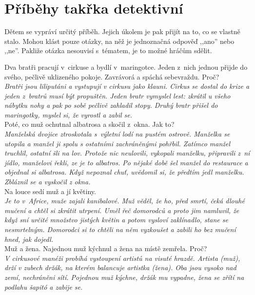 
\section{Příběhy takřka detektivní}

Dětem se vypráví určitý příběh. Jejich úkolem je pak přijít 
na to, co se vlastně stalo. Mohou klást pouze otázky, na něž 
je jednoznačná odpověď ,,ano'' nebo ,,ne''. Pakliže otázka nesouvisí 
s~tématem, je to možné hráčům sdělit.

\begin{multicols}{\value{columnsgames}}

\noindent
Dva bratři pracují v~cirkuse a bydlí v~maringotce. 
Jeden z~nich jednou přijde do svého, pečlivě uklizeného 
pokoje. Zavrávorá a spáchá sebevraždu. Proč?\\[1 mm]
{\sl Bratři jsou liliputáni a vystupují v cirkusu jako klauni. 
Cirkus se dostal do krize a jeden z~bratrů musí být propuštěn. 
Jeden bratr vymyslel lest: zkrátil u všeho nábytku nohy a pak 
po sobě pečlivě zahladil stopy. Druhý bratr přišel do maringotky, 
myslel si, že vyrostl a zabil se.}\\

\noindent
Poté, co muž ochutnal albatrosa a skočil z~okna. Jak to?\\[1 mm]
{\sl Manželská dvojice ztroskotala s~výletní lodí na pustém 
ostrově. Manželka se utopila a manžel ji spolu s ostatními zachráněnými 
pohřbil. Zatímco manžel truchlil, ostatní šli na lov. Protože 
nic neulovili, vykopali manželku, připravili z~ní jídlo, 
manželovi řekli, ze je to albatros. Po nějaké době šel manžel 
do restaurace a objednal si albatrosa. Když nepoznal chuť, uvědomil 
si, že předtím jedl manželku. Zbláznil se a vyskočil z okna.}\\

\noindent
Na louce sedí muž a jí květiny.\\[1 mm]
{\sl Je to v~Africe, muže zajali kanibalové. Muž věděl, 
že ho, před smrtí, čeká dlouhé mučení a chtěl si zkrátit utrpení. 
Uměl řeč domorodců a proto jim namluvil, že když sní určité množstvo 
jistých květin a potom vysloví zaklínadlo, stane se nesmrtelným. 
Domorodci si to chtěli na něm vyzkoušet a zabili ho bez mučení 
hned, jak dojedl.}\\

\noindent
Muž a žena. Najednou muž kýchnul a žena na místě zemřela.
Proč?\\[1 mm]
{\sl V cirkusové manéži probíhá vystoupení artistů na visuté hrazdě. 
Artista (muž), drží v zubech držák, na kterém balancuje artistka 
(žena). Oba jsou vysoko nad zemí, nechráněni sítí. Pojednou muž 
kýchne, držák mu vypadne, žena se zřítí na podlahu šapitó a zabije 
se.}\\


\end{multicols}
